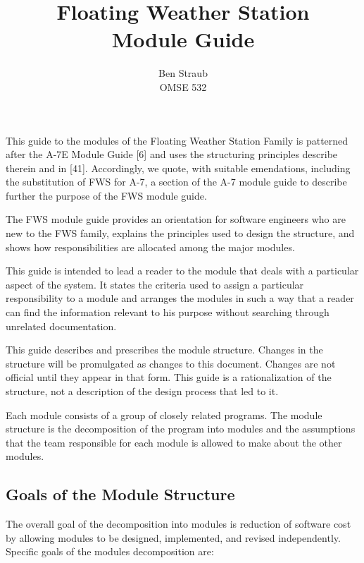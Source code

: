 \documentclass[letterpaper,11pt]{article}
\begin{document}
\author{Ben Straub\\OMSE 532}
\title{Floating Weather Station\\Module Guide}
\maketitle

\clearpage
\setcounter{tocdepth}{2}
\tableofcontents
\clearpage

This guide to the modules of the Floating Weather Station Family is patterned after the A-7E Module Guide [6] and uses the structuring principles describe therein and in [41]. Accordingly, we quote, with suitable emendations, including the substitution of FWS for A-7, a section of the A-7 module guide to describe further the purpose of the FWS module guide.

The FWS module guide provides an orientation for software engineers who are new to the FWS family, explains the principles used to design the structure, and shows how responsibilities are allocated among the major modules.

This guide is intended to lead a reader to the module that deals with a particular aspect of the system. It states the criteria used to assign a particular responsibility to a module and arranges the modules in such a way that a reader can find the information relevant to his purpose without searching through unrelated documentation.

This guide describes and prescribes the module structure. Changes in the structure will be promulgated as changes to this document. Changes are not official until they appear in that form. This guide is a rationalization of the structure, not a description of the design process that led to it.
 
Each module consists of a group of closely related programs. The module structure is the decomposition of the program into modules and the assumptions that the team responsible for each module is allowed to make about the other modules.

\subsection{Goals of the Module Structure}

The overall goal of the decomposition into modules is reduction of software cost by allowing modules to be designed, implemented, and revised independently.  Specific goals of the modules decomposition are:
\end{document}
